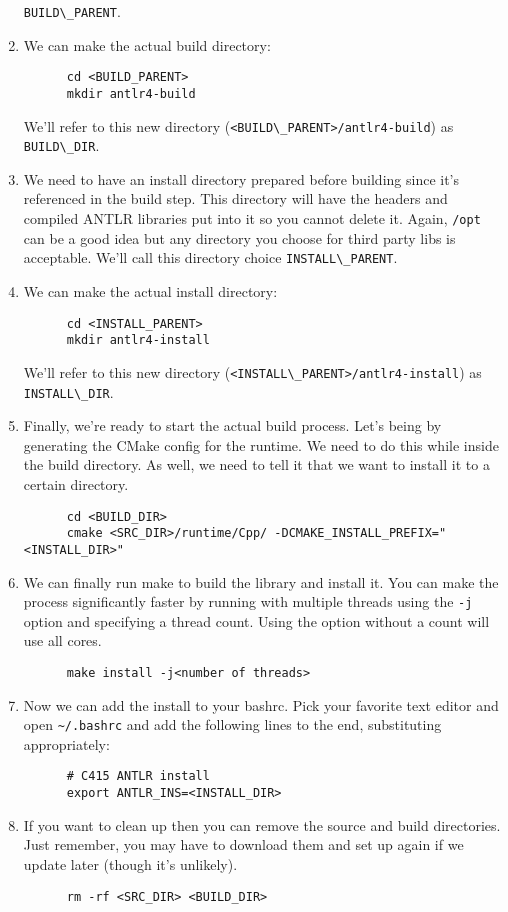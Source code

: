 \documentclass{article}
\begin{document}
\begin{enumerate}
    \lstinline{BUILD\_PARENT}.
  \item
    We can make the actual build directory:
    \begin{lstlisting}
      cd <BUILD_PARENT>
      mkdir antlr4-build
    \end{lstlisting}
    We'll refer to this new directory (\lstinline{<BUILD\_PARENT>/antlr4-build}) as
    \lstinline{BUILD\_DIR}.
  \item
    We need to have an install directory prepared before building since it's referenced in the
    build step. This directory will have the headers and compiled ANTLR libraries put into it so
    you cannot delete it. Again, \lstinline{/opt} can be a good idea but any directory you choose
    for third party libs is acceptable. We'll call this directory choice
    \lstinline{INSTALL\_PARENT}.
  \item
    We can make the actual install directory:
    \begin{lstlisting}
      cd <INSTALL_PARENT>
      mkdir antlr4-install
    \end{lstlisting}
    We'll refer to this new directory (\lstinline{<INSTALL\_PARENT>/antlr4-install}) as
    \lstinline{INSTALL\_DIR}.
  \item
    Finally, we're ready to start the actual build process. Let's being by generating the CMake
    config for the runtime. We need to do this while inside the build directory. As well, we need
    to tell it that we want to install it to a certain directory.
    \begin{lstlisting}
      cd <BUILD_DIR>
      cmake <SRC_DIR>/runtime/Cpp/ -DCMAKE_INSTALL_PREFIX="<INSTALL_DIR>"
    \end{lstlisting}
  \item
    We can finally run make to build the library and install it. You can make the process
    significantly faster by running with multiple threads using the \lstinline{-j} option and
    specifying a thread count. Using the option without a count will use all cores.
    \begin{lstlisting}
      make install -j<number of threads>
    \end{lstlisting}
  \item
    Now we can add the install to your bashrc. Pick your favorite text editor and open
    \lstinline{~/.bashrc} and add the following lines to the end, substituting appropriately:
    \begin{lstlisting}
      # C415 ANTLR install
      export ANTLR_INS=<INSTALL_DIR>
    \end{lstlisting}
  \item
    If you want to clean up then you can remove the source and build directories. Just remember,
    you may have to download them and set up again if we update later (though it's unlikely).
    \begin{lstlisting}
      rm -rf <SRC_DIR> <BUILD_DIR>
    \end{lstlisting}
\end{enumerate}
\end{document}
